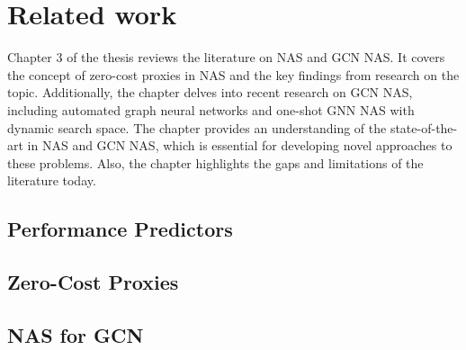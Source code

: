 \chapter{Related work}\label{chapter3}

Chapter 3 of the thesis reviews the literature on NAS and GCN NAS. It covers the concept of zero-cost proxies in NAS and the key findings from research on the topic. Additionally, the chapter delves into recent research on GCN NAS, including automated graph neural networks and one-shot GNN NAS with dynamic search space. The chapter provides an understanding of the state-of-the-art in NAS and GCN NAS, which is essential for developing novel approaches to these problems. Also, the chapter highlights the gaps and limitations of the literature today.  

\section{Performance Predictors}\label{sec:rel_performance}

\section{Zero-Cost Proxies}



\begin{comment}

\end{comment}

\section{NAS for GCN}\label{sec:nas_gcn}



